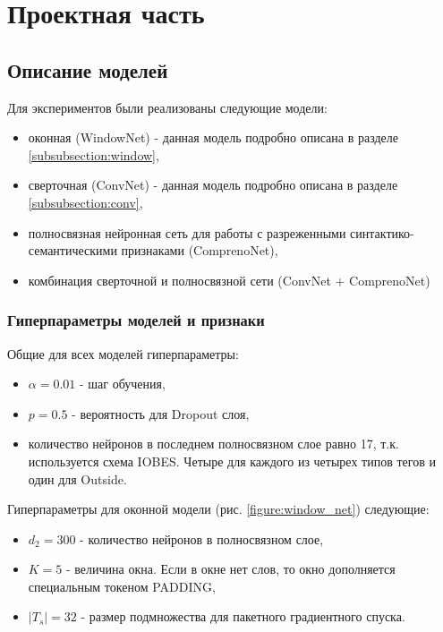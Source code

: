 \chapter{Проектная часть}

\section{Описание моделей} \label{section:models}

Для экспериментов были реализованы следующие модели:
\begin{itemize}
\item оконная (WindowNet) - данная модель подробно описана в разделе \ref{subsubsection:window},
\item сверточная (ConvNet) - данная модель подробно описана в разделе \ref{subsubsection:conv},
\item полносвязная нейронная сеть для работы с разреженными синтактико-семантическими признаками (ComprenoNet),
\item комбинация сверточной и полносвязной сети (ConvNet + ComprenoNet)
\end{itemize}

\subsection{Гиперпараметры моделей и признаки}

Общие для всех моделей гиперпараметры:
\begin{itemize}
\item $\alpha=0.01$ - шаг обучения,
\item $p=0.5$ - вероятность для Dropout слоя,
\item количество нейронов в последнем полносвязном слое равно 17,
т.к. используется схема IOBES. Четыре для каждого из четырех типов тегов и один для Outside.
\end{itemize}

Гиперпараметры для оконной модели (рис. \ref{figure:window_net}) следующие:
\begin{itemize}
\item $d_2 = 300$ - количество нейронов в полносвязном слое,
\item $K=5$ - величина окна. Если в окне нет слов, то окно дополняется специальным токеном PADDING,
\item $|T_s|=32$ - размер подмножества для пакетного градиентного спуска.
\end{itemize}

